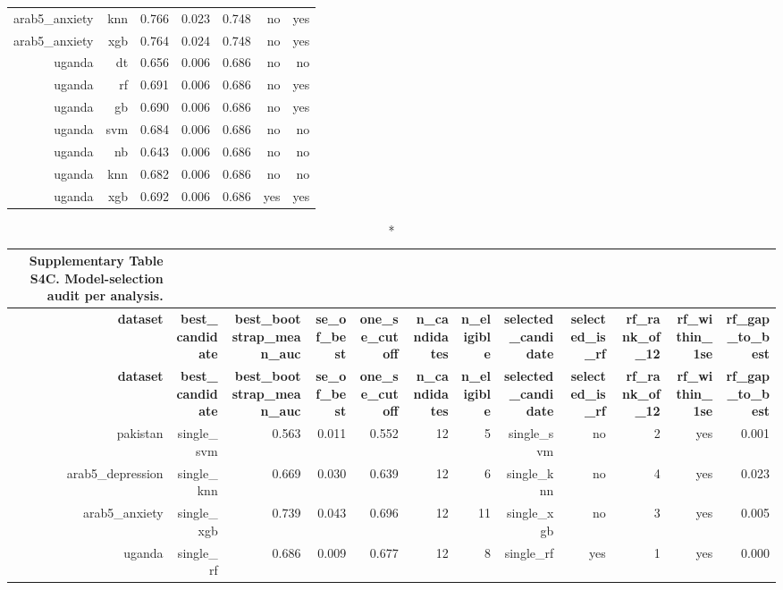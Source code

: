 \documentclass[10pt]{article}
\begin{document}
\begin{longtable}{rrrrrrr}
arab5\_anxiety & knn & 0.766 & 0.023 & 0.748 & no & yes \\
arab5\_anxiety & xgb & 0.764 & 0.024 & 0.748 & no & yes \\
uganda & dt & 0.656 & 0.006 & 0.686 & no & no \\
uganda & rf & 0.691 & 0.006 & 0.686 & no & yes \\
uganda & gb & 0.690 & 0.006 & 0.686 & no & yes \\
uganda & svm & 0.684 & 0.006 & 0.686 & no & no \\
uganda & nb & 0.643 & 0.006 & 0.686 & no & no \\
uganda & knn & 0.682 & 0.006 & 0.686 & no & no \\
uganda & xgb & 0.692 & 0.006 & 0.686 & yes & yes \\
\bottomrule
\end{longtable}
\normalsize

\tiny
\setlength{\tabcolsep}{2pt}
\begin{longtable}{rrrrrrrrrrrr}
\caption*{\textbf{Supplementary Table S4C.} Model-selection audit per analysis.}\\
\toprule
\textbf{dataset} & \textbf{best\_candidate} & \textbf{best\_bootstrap\_mean\_auc} & \textbf{se\_of\_best} & \textbf{one\_se\_cutoff} & \textbf{n\_candidates} & \textbf{n\_eligible} & \textbf{selected\_candidate} & \textbf{selected\_is\_rf} & \textbf{rf\_rank\_of\_12} & \textbf{rf\_within\_1se} & \textbf{rf\_gap\_to\_best} \\
\midrule
\endfirsthead
\toprule
\textbf{dataset} & \textbf{best\_candidate} & \textbf{best\_bootstrap\_mean\_auc} & \textbf{se\_of\_best} & \textbf{one\_se\_cutoff} & \textbf{n\_candidates} & \textbf{n\_eligible} & \textbf{selected\_candidate} & \textbf{selected\_is\_rf} & \textbf{rf\_rank\_of\_12} & \textbf{rf\_within\_1se} & \textbf{rf\_gap\_to\_best} \\
\midrule
\endhead
\bottomrule
\endfoot
pakistan & single\_svm & 0.563 & 0.011 & 0.552 & 12 & 5 & single\_svm & no & 2 & yes & 0.001 \\
arab5\_depression & single\_knn & 0.669 & 0.030 & 0.639 & 12 & 6 & single\_knn & no & 4 & yes & 0.023 \\
arab5\_anxiety & single\_xgb & 0.739 & 0.043 & 0.696 & 12 & 11 & single\_xgb & no & 3 & yes & 0.005 \\
uganda & single\_rf & 0.686 & 0.009 & 0.677 & 12 & 8 & single\_rf & yes & 1 & yes & 0.000 \\
\bottomrule
\end{longtable}
\normalsize
\end{document}
